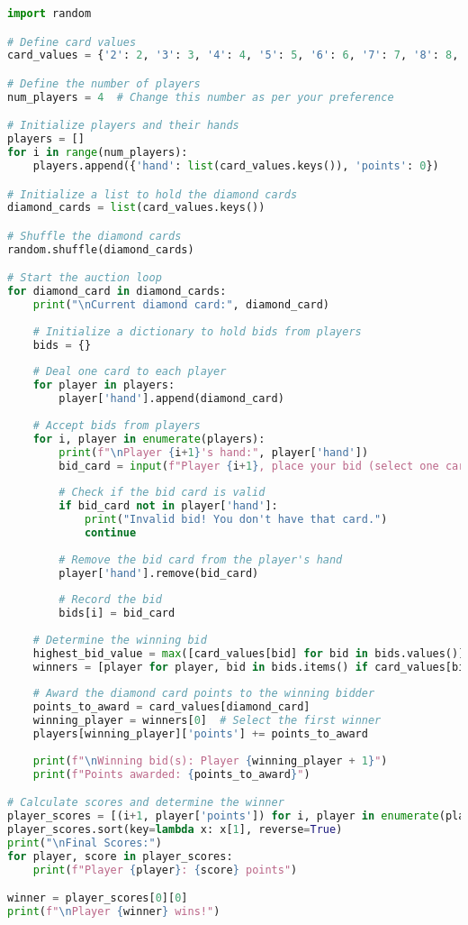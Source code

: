 \documentclass{article}
\begin{document}
\begin{lstlisting}[language=Python, caption={Optimized Code}]
import random

# Define card values
card_values = {'2': 2, '3': 3, '4': 4, '5': 5, '6': 6, '7': 7, '8': 8, '9': 9, 'T': 10, 'J': 11, 'Q': 12, 'K': 13, 'A': 14}

# Define the number of players
num_players = 4  # Change this number as per your preference

# Initialize players and their hands
players = []
for i in range(num_players):
    players.append({'hand': list(card_values.keys()), 'points': 0})

# Initialize a list to hold the diamond cards
diamond_cards = list(card_values.keys())

# Shuffle the diamond cards
random.shuffle(diamond_cards)

# Start the auction loop
for diamond_card in diamond_cards:
    print("\nCurrent diamond card:", diamond_card)
    
    # Initialize a dictionary to hold bids from players
    bids = {}
    
    # Deal one card to each player
    for player in players:
        player['hand'].append(diamond_card)
    
    # Accept bids from players
    for i, player in enumerate(players):
        print(f"\nPlayer {i+1}'s hand:", player['hand'])
        bid_card = input(f"Player {i+1}, place your bid (select one card from your hand): ")
        
        # Check if the bid card is valid
        if bid_card not in player['hand']:
            print("Invalid bid! You don't have that card.")
            continue
        
        # Remove the bid card from the player's hand
        player['hand'].remove(bid_card)
        
        # Record the bid
        bids[i] = bid_card
    
    # Determine the winning bid
    highest_bid_value = max([card_values[bid] for bid in bids.values()])
    winners = [player for player, bid in bids.items() if card_values[bid] == highest_bid_value]
    
    # Award the diamond card points to the winning bidder
    points_to_award = card_values[diamond_card]
    winning_player = winners[0]  # Select the first winner
    players[winning_player]['points'] += points_to_award
    
    print(f"\nWinning bid(s): Player {winning_player + 1}")
    print(f"Points awarded: {points_to_award}")

# Calculate scores and determine the winner
player_scores = [(i+1, player['points']) for i, player in enumerate(players)]
player_scores.sort(key=lambda x: x[1], reverse=True)
print("\nFinal Scores:")
for player, score in player_scores:
    print(f"Player {player}: {score} points")

winner = player_scores[0][0]
print(f"\nPlayer {winner} wins!")
\end{lstlisting}
\end{document}
